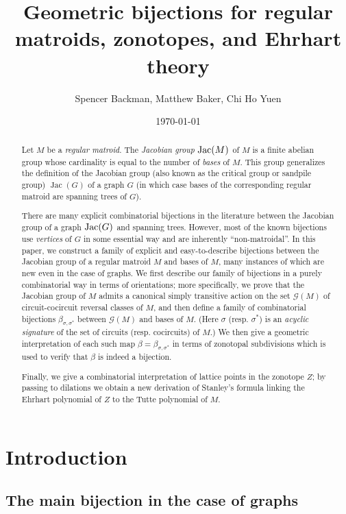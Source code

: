 \documentclass[12pt]{amsart}
\title[Zonotopal bijections for regular matroids]{Geometric bijections for regular matroids, zonotopes, and Ehrhart theory}
\author{Spencer Backman, Matthew Baker, Chi Ho Yuen}
\date{\today}  %
\numberwithin{equation}{section}
\theoremstyle{definition}
\newcommand{\Jac}{\operatorname{Jac}}
\begin{document}
\begin{abstract}
Let $M$ be a {\em regular matroid}.  The {\em Jacobian group} ${\rm Jac}(M)$ of $M$ 
is a finite abelian group whose cardinality is equal to the number of {\em bases} of $M$. This group
generalizes the definition of the Jacobian group (also known as the critical group or sandpile group) $\Jac(G)$ of a graph $G$ (in which case bases of the corresponding regular matroid are spanning trees of $G$).  

There are many explicit combinatorial bijections in the literature between the Jacobian group of a graph ${\rm Jac}(G)$ and spanning trees.  However, most of the known bijections use {\em vertices} of $G$ in some essential way and are inherently ``non-matroidal''. In this paper, we construct a family of explicit and easy-to-describe bijections between the Jacobian group of a regular matroid $M$ and bases of $M$, many instances of which are new even in the case of graphs. We first describe our family of bijections in a purely combinatorial way in terms of orientations; more specifically, we prove that the Jacobian group of $M$ admits a canonical simply transitive action on the set ${\mathcal G}(M)$ of circuit-cocircuit reversal classes of $M$, and then define a family of combinatorial bijections $\beta_{\sigma,\sigma^*}$ between ${\mathcal G}(M)$ and bases of $M$.  (Here $\sigma$ (resp. $\sigma^*$) is an {\em acyclic signature} of the set of circuits (resp. cocircuits) of $M$.)
We then give a geometric interpretation of each such map $\beta=\beta_{\sigma,\sigma^*}$ in terms of zonotopal subdivisions which is used to verify that $\beta$ is indeed a bijection. 



Finally, we give a combinatorial interpretation of lattice points in the zonotope $Z$; by passing to dilations we obtain
a new derivation of Stanley's formula linking the Ehrhart polynomial of $Z$ to the Tutte polynomial of $M$. 
\end{abstract}

\maketitle

\section{Introduction}


\subsection{The main bijection in the case of graphs}
\end{document}
